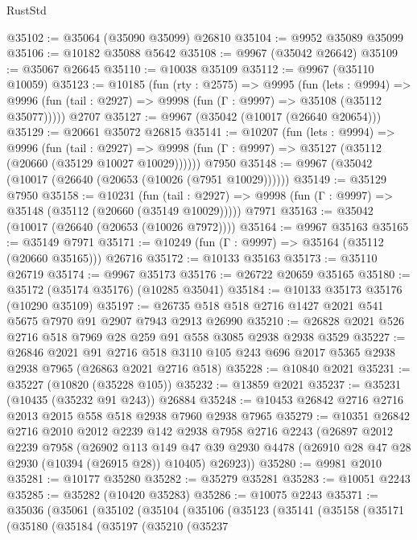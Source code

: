 \begin{lexlean}{RustStd}
\begin{coremodule}
@35102 := @35064 (@35090 @35099) @26810
@35104 := @9952 @35089 @35099
@35106 := @10182 @35088 @5642
@35108 := @9967 (@35042 @26642)
@35109 := @35067 @26645
@35110 := @10038 @35109
@35112 := @9967 (@35110 @10059)
@35123 := @10185
    (fun (rty : @2575) =>
    @9995
      (fun (lets : @9994) =>
      @9996 (fun (tail : @2927) => @9998 (fun (Γ : @9997) => @35108 (@35112 @35077)))))
    @2707
@35127 := @9967 (@35042 (@10017 (@26640 @20654)))
@35129 := @20661 @35072 @26815
@35141 := @10207
    (fun (lets : @9994) =>
    @9996
      (fun (tail : @2927) =>
      @9998 (fun (Γ : @9997) => @35127 (@35112 (@20660 (@35129 @10027 @10029))))))
    @7950
@35148 := @9967 (@35042 (@10017 (@26640 (@20653 (@10026 (@7951 @10029))))))
@35149 := @35129 @7950
@35158 := @10231
    (fun (tail : @2927) => @9998 (fun (Γ : @9997) => @35148 (@35112 (@20660 (@35149 @10029)))))
    @7971
@35163 := @35042 (@10017 (@26640 (@20653 (@10026 @7972))))
@35164 := @9967 @35163
@35165 := @35149 @7971
@35171 := @10249 (fun (Γ : @9997) => @35164 (@35112 (@20660 @35165))) @26716
@35172 := @10133 @35163
@35173 := @35110 @26719
@35174 := @9967 @35173
@35176 := @26722 @20659 @35165
@35180 := @35172 (@35174 @35176) (@10285 @35041)
@35184 := @10133 @35173 @35176 (@10290 @35109)
@35197 := @26735 @518 @518 @2716 @1427 @2021 @541 @5675 @7970 @91 @2907 @7943 @2913 @26990
@35210 := @26828 @2021 @526 @2716 @518 @7969 @28 @259 @91 @558 @3085 @2938 @2938 @3529
@35227 := @26846
    @2021
    @91
    @2716
    @518
    @3110
    @105
    @243
    @696
    @2017
    @5365
    @2938
    @2938
    @7965
    (@26863 @2021 @2716 @518)
@35228 := @10840 @2021
@35231 := @35227 (@10820 (@35228 @105))
@35232 := @13859 @2021
@35237 := @35231 (@10435 (@35232 @91 @243)) @26884
@35248 := @10453 @26842 @2716 @2716 @2013 @2015 @558 @518 @2938 @7960 @2938 @7965
@35279 := @10351
    @26842
    @2716
    @2010
    @2012
    @2239
    @142
    @2938
    @7958
    @2716
    @2243
    (@26897
      @2012
      @2239
      @7958
      (@26902
        @113
        @149
        @47
        @39
        @2930
        @4478
        (@26910 @28 @47 @28 @2930 (@10394 (@26915 @28)) @10405)
        @26923))
@35280 := @9981 @2010
@35281 := @10177 @35280
@35282 := @35279 @35281
@35283 := @10051 @2243
@35285 := @35282 (@10420 @35283)
@35286 := @10075 @2243
@35371 := @35036
    (@35061
      (@35102
        (@35104
          (@35106
            (@35123
              (@35141
                (@35158
                  (@35171
                    (@35180
                      (@35184
                        (@35197
                          (@35210
                            (@35237

\end{coremodule}
\end{lexlean}
